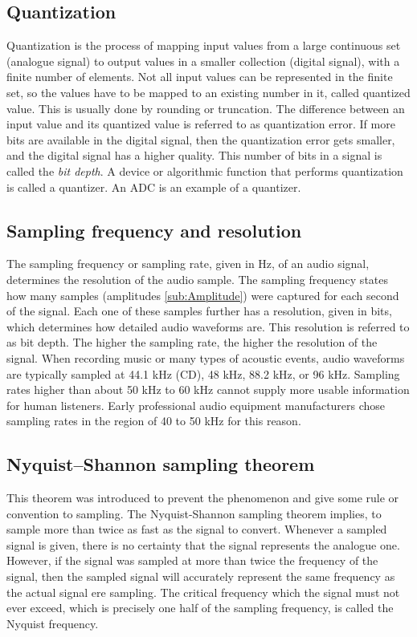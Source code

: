 \subsection{Quantization}
\label{sub:Quantization}
Quantization is the process of mapping input values from a large continuous set (analogue signal) to output values in a smaller collection (digital signal), with a finite number of elements. Not all input values can be represented in the finite set, so the values have to be mapped to an existing number in it, called quantized value. This is usually done by rounding or truncation. The difference between an input value and its quantized value is referred to as quantization error.  If more bits are available in the digital signal, then the quantization error gets smaller, and the digital signal has a higher quality. This number of bits in a signal is called the \textit{bit depth}. A device or algorithmic function that performs quantization is called a quantizer. An \gls{ADC} is an example of a quantizer. 

\subsection{Sampling frequency and resolution}
\label{sub:Sampling-Frequency-Resolution}
The sampling frequency or sampling rate, given in \gls{Hz}, of an audio signal, determines the resolution of the audio sample. The sampling frequency states how many samples (amplitudes \ref{sub:Amplitude}) were captured for each second of the signal. Each one of these samples further has a resolution, given in bits, which determines how detailed audio waveforms are. This resolution is referred to as bit depth. The higher the sampling rate, the higher the resolution of the signal. When recording music or many types of acoustic events, audio waveforms are typically sampled at 44.1 \gls{kHz} (CD), 48 \gls{kHz}, 88.2 \gls{kHz}, or 96 \gls{kHz}. Sampling rates higher than about 50 \gls{kHz} to 60 \gls{kHz} cannot supply more usable information for human listeners. Early professional audio equipment manufacturers chose sampling rates in the region of 40 to 50 \gls{kHz} for this reason.

\subsection{Nyquist–Shannon sampling theorem}
\label{sub:Nyquist–Shannon}
This theorem was introduced to prevent the  phenomenon and give some rule or convention to sampling. The Nyquist-Shannon sampling theorem implies, to sample more than twice as fast as the signal to convert.
\newline
\newline
Whenever a sampled signal is given, there is no certainty that the signal represents the analogue one. However, if the signal was sampled at more than twice the frequency of the signal, then the sampled signal will accurately represent the same frequency as the actual signal ere sampling. The critical frequency which the signal must not ever exceed, which is precisely one half of the sampling frequency, is called the Nyquist frequency.

